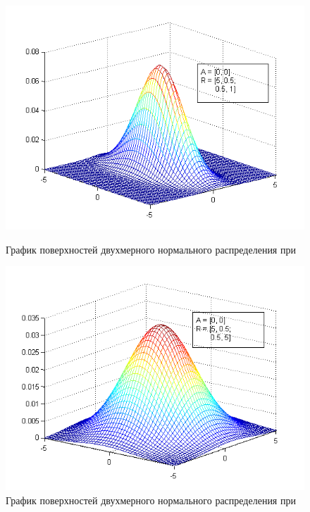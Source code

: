 \begin{figure}[h]
  \begin{minipage}[h]{0.49\linewidth}
    \includegraphics[width=1\linewidth]{../pic/new/normal_mesh_3}
    \caption{График поверхностей двухмерного нормального распределения при}
  \end{minipage}
  \hfill
  \begin{minipage}[h]{0.49\linewidth}
    \vspace{4mm}
    \includegraphics[width=1\linewidth]{../pic/new/normal_mesh_4}
    \caption{График поверхностей двухмерного нормального распределения при}
    \label{pic:normal_mesh_end}
  \end{minipage}
\end{figure}


